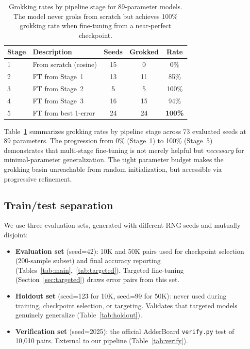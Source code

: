 \documentclass[11pt]{article}
\begin{document}
\begin{table}[t]
\centering
\caption{Grokking rates by pipeline stage for 89-parameter models. The
model never groks from scratch but achieves 100\% grokking rate when
fine-tuning from a near-perfect checkpoint.}
\label{tab:grokking}
\vspace{4pt}
\begin{tabular}{@{}llccc@{}}
\toprule
Stage & Description & Seeds & Grokked & Rate \\
\midrule
1 & From scratch (cosine) & 15 & 0 & 0\% \\
2 & FT from Stage~1       & 13 & 11 & 85\% \\
3 & FT from Stage~2       & 5  & 5  & 100\% \\
4 & FT from Stage~3       & 16 & 15 & 94\% \\
5 & FT from best 1-error  & 24 & 24 & \textbf{100\%} \\
\bottomrule
\end{tabular}
\end{table}

Table~\ref{tab:grokking} summarizes grokking rates by pipeline stage
across 73 evaluated seeds at 89 parameters. The progression from 0\%
(Stage~1) to 100\% (Stage~5) demonstrates that multi-stage fine-tuning
is not merely helpful but \emph{necessary} for minimal-parameter
generalization. The tight parameter budget makes the grokking basin
unreachable from random initialization, but accessible via progressive
refinement.

\subsection{Train/test separation}

We use three evaluation sets, generated with different RNG seeds and
mutually disjoint:

\begin{itemize}[leftmargin=*, itemsep=2pt]
  \item \textbf{Evaluation set} (seed=42): 10K and 50K pairs used for
    checkpoint selection (200-sample subset) and final accuracy reporting
    (Tables~\ref{tab:main},~\ref{tab:targeted}). Targeted fine-tuning
    (Section~\ref{sec:targeted}) draws error pairs from this set.
  \item \textbf{Holdout set} (seed=123 for 10K, seed=99 for 50K): never
    used during training, checkpoint selection, or targeting. Validates
    that targeted models genuinely generalize
    (Table~\ref{tab:holdout}).
  \item \textbf{Verification set} (seed=2025): the official AdderBoard
    \texttt{verify.py} test of 10,010 pairs. External to our pipeline
    (Table~\ref{tab:verify}).
\end{itemize}
\end{document}

